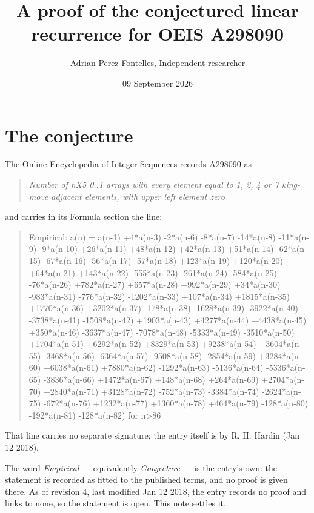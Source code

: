 \documentclass[11pt]{article}
\title{A proof of the conjectured linear recurrence for OEIS A298090}
\author{Adrian Perez Fontelles, Independent researcher}
\date{09 September 2026}
\theoremstyle{definition}
\begin{document}
\maketitle
\section{The conjecture}

The Online Encyclopedia of Integer Sequences records \href{https://oeis.org/A298090}{A298090} as

\begin{quote}\itshape Number of nX5 0..1 arrays with every element equal to 1, 2, 4 or 7 king-move adjacent elements, with upper left element zero\end{quote}

and carries in its Formula section the line:

\begin{quote}\ttfamily Empirical: a(n) = a(n-1) +4*a(n-3) -2*a(n-6) -8*a(n-7) -14*a(n-8) -11*a(n-9) -9*a(n-10) +26*a(n-11) +48*a(n-12) +42*a(n-13) +51*a(n-14) -62*a(n-15) -67*a(n-16) -56*a(n-17) -57*a(n-18) +123*a(n-19) +120*a(n-20) +64*a(n-21) +143*a(n-22) -555*a(n-23) -261*a(n-24) -584*a(n-25) -76*a(n-26) +782*a(n-27) +657*a(n-28) +992*a(n-29) +34*a(n-30) -983*a(n-31) -776*a(n-32) -1202*a(n-33) +107*a(n-34) +1815*a(n-35) +1770*a(n-36) +3202*a(n-37) -178*a(n-38) -1628*a(n-39) -3922*a(n-40) -3738*a(n-41) -1508*a(n-42) +1903*a(n-43) +4277*a(n-44) +4438*a(n-45) +350*a(n-46) -3637*a(n-47) -7078*a(n-48) -5333*a(n-49) -3510*a(n-50) +1704*a(n-51) +6292*a(n-52) +8329*a(n-53) +9238*a(n-54) +3604*a(n-55) -3468*a(n-56) -6364*a(n-57) -9508*a(n-58) -2854*a(n-59) +3284*a(n-60) +6038*a(n-61) +7880*a(n-62) -1292*a(n-63) -5136*a(n-64) -5336*a(n-65) -3836*a(n-66) +1472*a(n-67) +148*a(n-68) +264*a(n-69) +2704*a(n-70) +2840*a(n-71) +3128*a(n-72) -752*a(n-73) -3384*a(n-74) -2624*a(n-75) -672*a(n-76) +1232*a(n-77) +1360*a(n-78) +464*a(n-79) -128*a(n-80) -192*a(n-81) -128*a(n-82) for n>86\end{quote}

That line carries no separate signature; the entry itself is by R. H. Hardin (Jan 12 2018).

The word {\itshape Empirical} --- equivalently {\itshape Conjecture} --- is the entry's own: the statement is recorded as fitted to the published terms, and no proof is given there. As of revision 4, last modified Jan 12 2018, the entry records no proof and links to none, so the statement is open. This note settles it.
\end{document}
